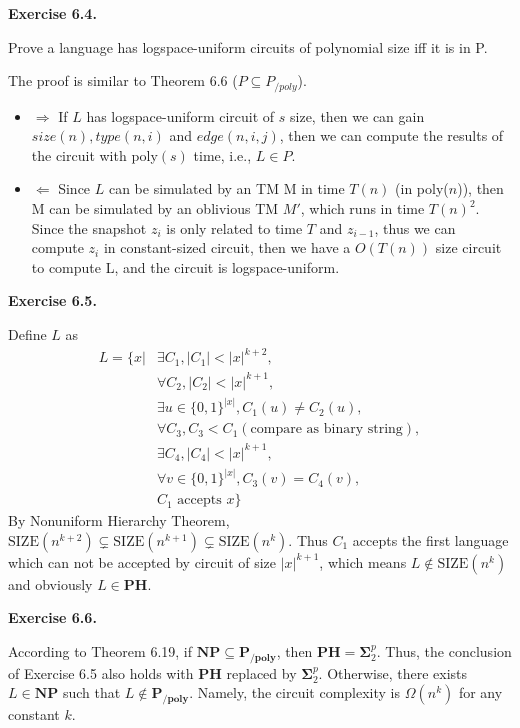 \documentclass[a4paper]{article}
\newenvironment{exercise}[1]{
	\par
	\noindent\textbf{Exercise #1.}\quad
}{
	\par
	\bigskip
}
\newcommand{\bin}{\{0,1\}}
\begin{document}
\begin{exercise}{6.4}
Prove a language has logspace-uniform circuits of polynomial size iff it is in P.

    The proof is similar to Theorem 6.6 ($P \subseteq P_{/poly}$).

\begin{itemize}
\item $\Rightarrow$  If $L$ has logspace-uniform circuit of $s$ size, then we can gain $size(n), type(n,i)$ and $edge(n,i,j)$, then we can compute the results of the circuit with poly$(s)$ time, i.e., $L \in P$.

\item $\Leftarrow$ Since $L$ can be simulated by an TM M in time $T(n)$ (in poly($n$)), then M can be simulated by an oblivious TM $M'$, which runs in time $T(n)^{2}$. Since  the snapshot $z_{i}$ is only related to time $T$ and $z_{i-1}$, thus we can compute $z_{i}$ in constant-sized circuit, then we have a $O(T(n))$ size circuit to compute L, and the circuit is logspace-uniform.
\end{itemize}
\end{exercise}

\begin{exercise}{6.5}
    Define $L$ as
    \begin{align*}
        L=\Big\{x\Big|
        &\exists C_1,|C_1|<|x|^{k+2},\\
        &\forall C_2,|C_2|<|x|^{k+1},\\
        &\exists u\in\bin^{|x|},C_1(u)\neq C_2(u),\\
        &\forall C_3,C_3<C_1 (\text{compare as binary string}),\\
        &\exists C_4,|C_4|<|x|^{k+1},\\
        &\forall v\in\bin^{|x|},C_3(v)=C_4(v),\\
        &C_1\text{ accepts }x\Big\}
    \end{align*}
    By Nonuniform Hierarchy Theorem, $\text{SIZE}(n^{k+2})\subsetneq\text{SIZE}(n^{k+1})\subsetneq\text{SIZE}(n^k)$.
    Thus $C_1$ accepts the first language which can not be accepted by circuit of size $|x|^{k+1}$, which means
    $L\notin\text{SIZE}(n^k)$ and obviously $L\in\textbf{PH}$.
\end{exercise}


\begin{exercise}{6.6}
    According to Theorem 6.19, if $\textbf{NP} \subseteq \textbf{P}_{\textbf{/poly}}$, then $\textbf{PH} = \mathbf{\Sigma}_2^p$. Thus, the conclusion of Exercise 6.5 also holds with $\mathbf{PH}$ replaced by $\mathbf{\Sigma}_2^p$. Otherwise, there exists $L \in \textbf{NP}$ such that $L \not\in \textbf{P}_{\textbf{/poly}}$. Namely, the circuit complexity is $\Omega(n^k)$ for any constant $k$.
\end{exercise}
\end{document}
